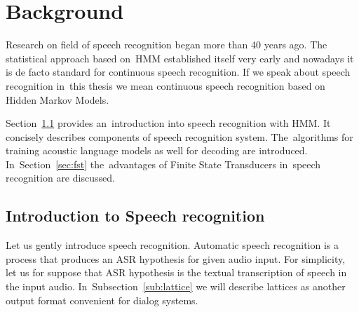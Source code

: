 \chapter{Background}
\label{cha:background}

% 
% 

Research on field of speech recognition began more than 40 years ago. The statistical approach based 
on~\ac{HMM} established itself very early and nowadays it is de facto standard for continuous speech recognition. 
If we speak about speech recognition in~this thesis we mean continuous speech recognition based on Hidden Markov Models. 

Section~\ref{sec:general_introduction} provides an~introduction into speech recognition with \ac{HMM}. 
It concisely describes components of speech recognition system. The~algorithms for training acoustic language models 
as well for decoding are introduced. In~Section~\ref{sec:fst} the~advantages of Finite State Transducers 
in~speech recognition are discussed.

\section{Introduction to Speech recognition} 
\label{sec:general_introduction}
Let us gently introduce speech recognition. Automatic speech recognition is a process
that produces an \ac{ASR} hypothesis for given audio input. 
For simplicity, let us for suppose that ASR hypothesis is the textual transcription of speech in the input audio. 
In~Subsection~\ref{sub:lattice} we will describe lattices as another output format convenient for dialog systems.

